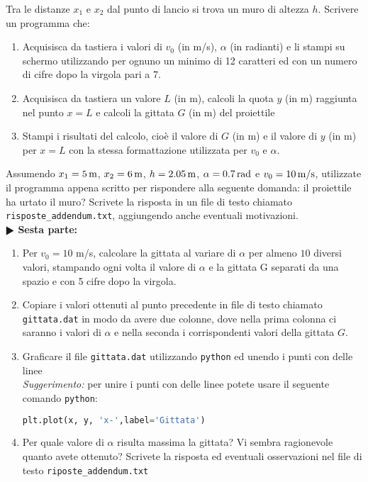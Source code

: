\documentclass[11pt]{article}
\begin{document}
Tra le distanze $x_1$ e $x_2$ dal punto di lancio si trova un muro di altezza $h$.
Scrivere un programma che:
\begin{enumerate}
  \item Acquisisca da tastiera i valori di $v_0$ (in m/s), $\alpha$ (in radianti) e li stampi su schermo utilizzando per ognuno un minimo di 12 caratteri ed con un numero di cifre dopo la virgola pari a 7. 
  \item Acquisisca da tastiera un valore $L$ (in m), calcoli la quota $y$ (in m) raggiunta nel punto $x = L$ e
    calcoli la gittata $G$ (in m) del proiettile
  \item Stampi i risultati del calcolo, cioè il valore di $G$ (in m) e il valore di $y$ (in m) per $x=L$ 
        con la stessa formattazione utilizzata per $v_0$ e $\alpha$.
\end{enumerate}
Assumendo $x_1=5\,\hbox{m}$, $x_2=6\,\hbox{m}$, $h=2.05\,\hbox{m}$, $\alpha=0.7\,\hbox{rad}$ e $v_0=10\,\hbox{m/s}$,
utilizzate il programma appena scritto per rispondere alla seguente domanda: il proiettile ha urtato il muro? 
Scrivete la risposta in un file di testo chiamato \texttt{risposte\_addendum.txt}, aggiungendo anche eventuali motivazioni.
\vspace{3mm} \\
\textbf{$\RHD$ Sesta parte:} 
\begin{enumerate}
  \item Per $v_0=10$ m/s, calcolare la gittata al variare di $\alpha$ per almeno $10$ diversi valori, stampando 
   ogni volta il valore di $\alpha$ e la gittata G separati da una spazio e con 5 cifre dopo la virgola.
  
 \item Copiare i valori ottenuti al punto precedente in file di testo chiamato \texttt{gittata.dat} 
     in modo da avere due colonne, dove nella prima colonna ci saranno i valori di $\alpha$ 
      e nella seconda i corrispondenti valori della gittata $G$.

    \item Graficare il file \texttt{gittata.dat} utilizzando \texttt{python} ed unendo i punti con delle linee \\
      {\em Suggerimento:\/} per unire i punti con delle linee potete usare il seguente comando \texttt{python}:
    \vspace{0.2cm}
\begin{lstlisting}[language=Python,numbers=none]
  plt.plot(x, y, 'x-',label='Gittata')
\end{lstlisting}
 \item Per quale valore di $\alpha$ risulta massima la gittata? Vi sembra ragionevole quanto avete ottenuto?
      Scrivete la risposta ed eventuali osservazioni nel file di testo \texttt{riposte\_addendum.txt}
\end{enumerate}  
\end{document}
